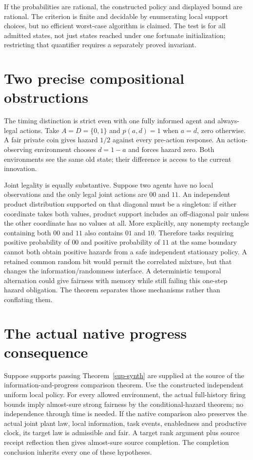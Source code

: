\documentclass[11pt]{article}
\begin{document}
If the probabilities are rational, the constructed policy and displayed bound are rational. The criterion is finite and decidable by enumerating local support choices, but no efficient worst-case algorithm is claimed. The test is for all admitted states, not just states reached under one fortunate initialization; restricting that quantifier requires a separately proved invariant.

\section{Two precise compositional obstructions}
The timing distinction is strict even with one fully informed agent and always-legal actions. Take $A=D=\{0,1\}$ and $p(a,d)=1$ when $a=d$, zero otherwise. A fair private coin gives hazard $1/2$ against every pre-action response. An action-observing environment chooses $d=1-a$ and forces hazard zero. Both environments see the same old state; their difference is access to the current innovation.

Joint legality is equally substantive. Suppose two agents have no local observations and the only legal joint actions are $00$ and $11$. An independent product distribution supported on that diagonal must be a singleton: if either coordinate takes both values, product support includes an off-diagonal pair unless the other coordinate has no values at all. More explicitly, any nonempty rectangle containing both $00$ and $11$ also contains $01$ and $10$. Therefore tasks requiring positive probability of $00$ and positive probability of $11$ at the same boundary cannot both obtain positive hazards from a safe independent stationary policy. A retained common random bit would permit the correlated mixture, but that changes the information/randomness interface. A deterministic temporal alternation could give fairness with memory while still failing this one-step hazard obligation. The theorem separates those mechanisms rather than conflating them.

\section{The actual native progress consequence}
Suppose supports passing Theorem~\ref{sup-synth} are supplied at the source of the information-and-progress comparison theorem. Use the constructed independent uniform local policy. For every allowed environment, the actual full-history firing bounds imply almost-sure strong fairness by the conditional-hazard theorem; no independence through time is needed. If the native comparison also preserves the actual joint plant law, local information, task events, enabledness and productive clock, its target law is admissible and fair. A target rank argument plus source receipt reflection then gives almost-sure source completion. The completion conclusion inherits every one of these hypotheses.
\end{document}
